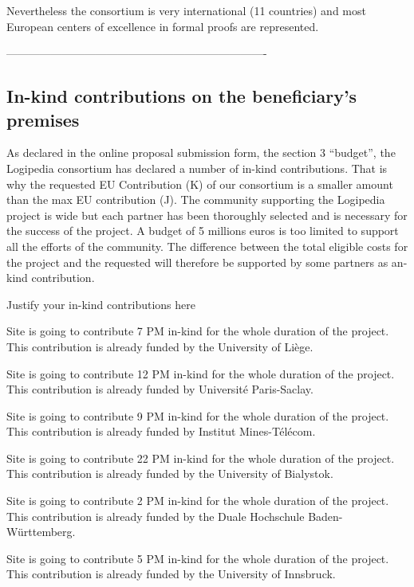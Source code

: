 Nevertheless the consortium is very international (11 countries)
and most European centers of excellence in formal proofs are represented.



----------------------------------------------------------------------



\subsection*{In-kind contributions on the beneficiary’s premises}

As declared in the online proposal submission form, the section 3
``budget'', the Logipedia consortium has declared a number of in-kind
contributions. That is why the requested EU Contribution (K) of our
consortium is a smaller amount than the max EU contribution (J). The
community supporting the Logipedia project is wide but each partner
has been thoroughly selected and is necessary for the success of the
project. A budget of 5 millions euros is too limited to support all
the efforts of the community. The difference between the total
eligible costs for the project and the requested will therefore be
supported by some partners as an-kind contribution.

{\color{red} Justify your in-kind contributions here}

Site  is going to contribute 7 PM in-kind for the whole duration of the project.
This contribution is already funded by the University of Liège.

Site  is going to contribute 12 PM in-kind for the whole duration of the project.
This contribution is already funded by Université Paris-Saclay.

Site  is going to contribute 9 PM in-kind for the whole duration of the project.
This contribution is already funded by Institut Mines-Télécom.

Site  is going to contribute 22 PM in-kind for the whole duration of the project.
This contribution is already funded by the University of Bialystok.

Site  is going to contribute 2 PM in-kind for the whole duration of the project.
This contribution is already funded by the Duale Hochschule Baden-Württemberg.

Site  is going to contribute 5 PM in-kind for the whole duration of the project.
This contribution is already funded by the University of Innsbruck.

